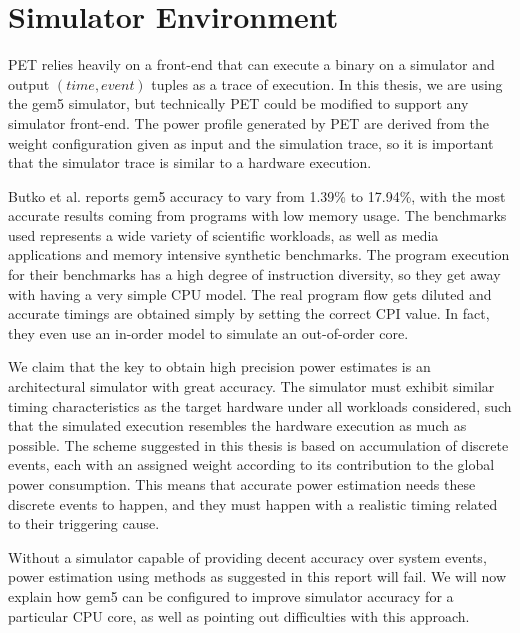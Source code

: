 \section{Simulator Environment}

PET relies heavily on a front-end that can execute a binary on a simulator and
output $(time, event)$ tuples as a trace of execution. In this thesis, we are
using the gem5 simulator, but technically PET could be modified to support any
simulator front-end. The power profile generated by PET are derived from the
weight configuration given as input and the simulation trace, so it is important
that the simulator trace is similar to a hardware execution.

Butko et al. \cite{butko2012accuracy} reports gem5 accuracy to vary from 1.39\%
to 17.94\%, with the most accurate results coming from programs with low memory
usage. The benchmarks used represents a wide variety of scientific workloads, as
well as media applications and memory intensive synthetic benchmarks. The
program execution for their benchmarks has a high degree of instruction
diversity, so they get away with having a very simple CPU model. The real
program flow gets diluted and accurate timings are obtained simply by setting
the correct CPI value. In fact, they even use an in-order model to simulate an
out-of-order core.

We claim that the key to obtain high precision power estimates is an
architectural simulator with great accuracy. The simulator must exhibit similar
timing characteristics as the target hardware under all workloads considered,
such that the simulated execution resembles the hardware execution as much as
possible. The scheme suggested in this thesis is based on accumulation of
discrete events, each with an assigned weight according to its contribution to
the global power consumption. This means that accurate power estimation needs
these discrete events to happen, and they must happen with a realistic timing
related to their triggering cause.

Without a simulator capable of providing decent accuracy over system events,
power estimation using methods as suggested in this report will fail. We will
now explain how gem5 can be configured to improve simulator accuracy for a
particular CPU core, as well as pointing out difficulties with this approach.


